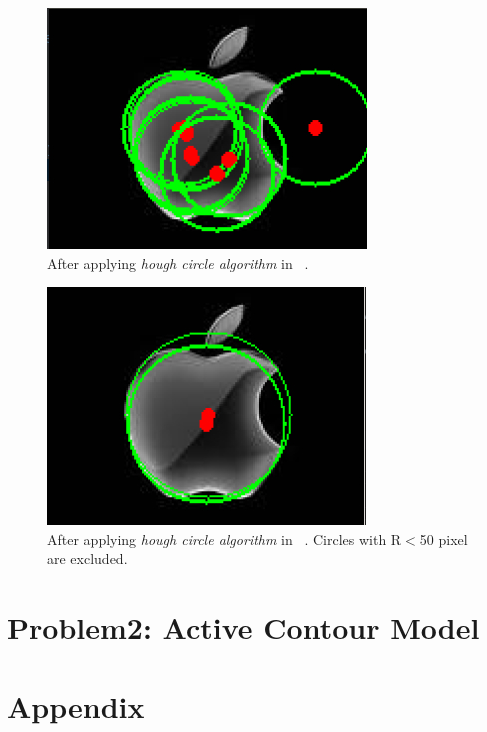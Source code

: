 \documentclass[letterpaper, 12 pt, conference ,onecolumn]{ieeeconf}  %
\begin{document}
\begin{figure}[h!]
\includegraphics[width=0.4\paperwidth]{hough-circles/apple-circles1.jpg}
\caption{After applying \textit{hough circle algorithm} in ~.}
\label{fig:apple1-circles1}
\end{figure}

\begin{figure}[h!]
\includegraphics[width=0.4\paperwidth]{hough-circles/apple-circles2.jpg}
\caption{After applying \textit{hough circle algorithm} in ~. Circles with R$<$50 pixel are excluded.}
\label{fig:apple1-circles2}
\end{figure}

\section*{Problem2: Active Contour Model}


\section*{Appendix }







\end{document}

